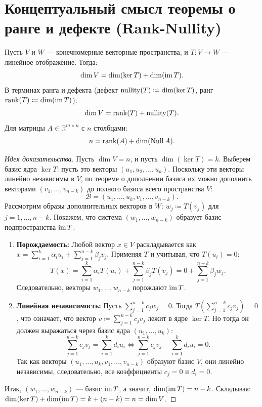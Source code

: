\section{Концептуальный смысл теоремы о ранге и дефекте (Rank-Nullity)}

\begin{theorem}
Пусть $V$ и $W$ — конечномерные векторные пространства, и $T \colon V \to W$ — линейное отображение.
Тогда:
\[ \dim V = \dim(\ker T) + \dim(\operatorname{im} T). \]
В терминах ранга и дефекта (дефект $\operatorname{nullity}(T) \coloneqq \dim(\ker T)$, ранг $\operatorname{rank}(T) \coloneqq \dim(\operatorname{im} T)$):
\[ \dim V = \operatorname{rank}(T) + \operatorname{nullity}(T). \]
Для матрицы $A \in \mathbb{R}^{m \times n}$ с $n$ столбцами:
\[ n = \operatorname{rank}(A) + \dim(\operatorname{Null} A). \]
\end{theorem}

\begin{proof}[Идея доказательства]
Пусть $\dim V = n$, и пусть $\dim(\ker T) = k$.
Выберем базис ядра $\ker T$: пусть это векторы $(u_1, u_2, \dots, u_k)$.
Поскольку эти векторы линейно независимы в $V$, по теореме о дополнении базиса их можно дополнить векторами $(v_1,
\dots, v_{n-k})$ до полного базиса всего пространства $V$:
\[ \mathcal{B} = (u_1, \dots, u_k, v_1, \dots, v_{n-k}). \]
Рассмотрим образы дополнительных векторов в $W$: $w_j \coloneqq T(v_j)$ для $j = 1, \dots, n-k$.
Покажем, что система $(w_1, \dots, w_{n-k})$ образует базис подпространства $\operatorname{im} T$:
\begin{enumerate}
    \item \textbf{Порождаемость:} Любой вектор $x \in V$ раскладывается как $x = \sum_{i=1}^k \alpha_i u_i +
    \sum_{j=1}^{n-k} \beta_j v_j$.
    Применяя $T$ и учитывая, что $T(u_i) = 0$:
    \[ T(x) = \sum_{i=1}^k \alpha_i T(u_i) + \sum_{j=1}^{n-k} \beta_j T(v_j) = 0 + \sum_{j=1}^{n-k} \beta_j w_j. \]
    Следовательно, векторы $w_1, \dots, w_{n-k}$ порождают $\operatorname{im} T$.
    \item \textbf{Линейная независимость:} Пусть $\sum_{j=1}^{n-k} c_j w_j = 0$.
    Тогда $T\left(\sum_{j=1}^{n-k} c_j
    v_j\right) = 0$, что означает, что вектор $v \coloneqq \sum_{j=1}^{n-k} c_j v_j$ лежит в ядре $\ker T$.
    Но тогда он должен выражаться через базис ядра $(u_1, \dots, u_k)$:
    \[ \sum_{j=1}^{n-k} c_j v_j = \sum_{i=1}^k d_i u_i \iff \sum_{j=1}^{n-k} c_j v_j - \sum_{i=1}^k d_i u_i = 0. \]
    Так как векторы $(u_1,\dots, u_k,v_1,\dots, v_{n-k})$ образуют базис $V$, они линейно независимы, следовательно, все
    коэффициенты $c_j = 0$ и $d_i = 0$.
\end{enumerate}
Итак, $(w_1, \dots, w_{n-k})$ — базис $\operatorname{im} T$, а значит, $\dim(\operatorname{im} T) = n - k$.
Складывая: $\dim(\ker T) + \dim(\operatorname{im} T) = k + (n - k) = n = \dim V$.
\end{proof}

